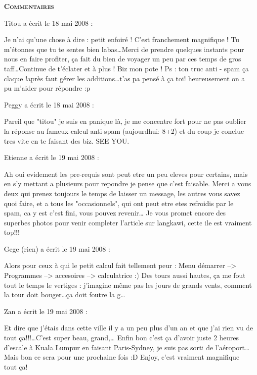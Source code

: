 \bigskip
\textbf{\textsc{Commentaires}}

\medskip
Titou a écrit le 18 mai 2008 :
\begin{displayquote}
Je n'ai qu'une chose à dire : petit enfoiré ! C'est franchement magnifique ! Tu m'étonnes que tu te sentes bien labas\dots Merci de prendre quelques instants pour nous en faire profiter, ça fait du bien de voyager un peu par ces temps de gros taff\dots Continue de t'éclater et à plus ! Biz mon pote !
Ps : ton truc anti - spam ça claque !après faut gérer les additions\dots t'as pa pensé à ça toi! heureusement on a pu m'aider pour répondre :p
\end{displayquote}

\medskip
Peggy a écrit le 18 mai 2008 :
\begin{displayquote}
Pareil que "titou" je suis en panique là, je me concentre fort pour ne pas oublier la réponse au fameux calcul anti-spam (aujourdhui: 8+2) et du coup je conclue tres vite en te faisant des biz.
SEE YOU.
\end{displayquote}

\medskip
Etienne a écrit le 19 mai 2008 :
\begin{displayquote}
Ah oui evidement les pre-requis sont peut etre un peu eleves pour certains, mais en s'y mettant a plusieurs pour repondre je pense que c'est faisable.
Merci a vous deux qui prenez toujours le temps de laisser un message, les autres vous savez quoi faire, et a tous les "occasionnels", qui ont peut etre etes refroidis par le spam, ca y est c'est fini, vous pouvez revenir\dots
Je vous promet encore des superbes photos pour venir completer l'article sur langkawi, cette ile est vraiment top!!!
\end{displayquote}

\medskip
Gege (rien) a écrit le 19 mai 2008 :
\begin{displayquote}
Alors pour ceux à qui le petit calcul fait tellement peur : Menu démarrer --> Programmes --> accesoires --> calculatrice :)
Des tours aussi hautes, ça me fout tout le temps le vertiges : j'imagine même pas les jours de grands vents, comment la tour doit bouger\dots ça doit foutre la g\dots
\end{displayquote}

\medskip
Zan a écrit le 19 mai 2008 :
\begin{displayquote}
Et dire que j'étais dans cette ville il y a un peu plus d'un an et que j'ai rien vu de tout ça!!!\dots C'est super beau, grand,\dots
Enfin bon c'est ça d'avoir juste 2 heures d'escale à Kuala Lumpur en faisant Paris-Sydney, je suis pas sorti de l'aéroport\dots Mais bon ce sera pour une prochaine fois :D
Enjoy, c'est vraiment magnifique tout ça!
\end{displayquote}

\vfill
